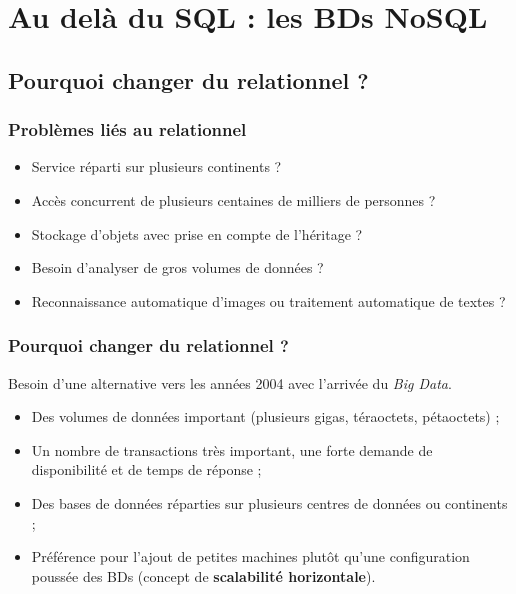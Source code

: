 \section{Au delà du SQL : les BDs NoSQL}

	\subsection{Pourquoi changer du relationnel ?}
	\begin{frame}
		\frametitle{Problèmes liés au relationnel}

		\begin{itemize}
			\item Service réparti sur plusieurs continents ?
			\item Accès concurrent de plusieurs centaines de milliers de personnes ?
			\item Stockage d'objets avec prise en compte de l'héritage ?
			\item Besoin d'analyser de gros volumes de données ?
			\item Reconnaissance automatique d'images ou traitement automatique de textes ?
		\end{itemize}

	\end{frame}

	\begin{frame}
		\frametitle{Pourquoi changer du relationnel ?}

		Besoin d'une alternative vers les années 2004 avec l'arrivée du \textit{Big Data}.
		\begin{itemize}
			\item Des volumes de données important (plusieurs gigas, téraoctets, pétaoctets) ;
			\item Un nombre de transactions très important, une forte demande de disponibilité et de temps de réponse ;
			\item Des bases de données réparties sur plusieurs centres de données ou continents ;
			\item Préférence pour l'ajout de petites machines plutôt qu'une configuration poussée des BDs (concept de \textbf{scalabilité horizontale}).
		\end{itemize}

	\end{frame}

